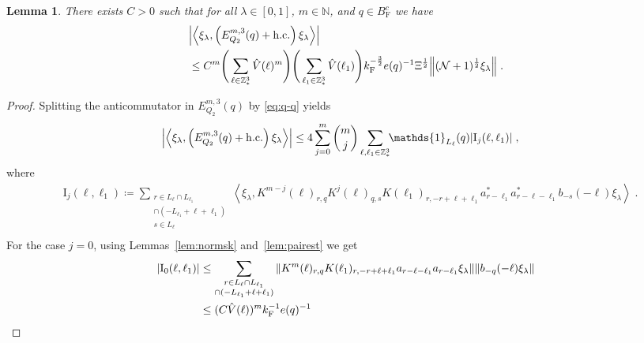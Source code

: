 \documentclass[12pt,a4paper]{article}
\numberwithin{equation}{section}
\newcommand{\NNN}{\mathbb{N}}
\newcommand{\1}{\mathbb{I}}
\newcommand{\F}{\mathrm{F}}
\newcommand{\I}{\mathrm{I}}
\newcommand{\Z}{\mathbb{Z}}
\newcommand{\NN}{\mathcal{N}}
\newcommand{\half}{\frac{1}{2}}
\newcommand{\eva}[1]{\left\langle #1 \right\rangle}
\theoremstyle{plain}
\newtheorem{lemma}[theorem]{Lemma}
\theoremstyle{definition}
\theoremstyle{remark}
\theoremstyle{plain}
\theoremstyle{definition}
\theoremstyle{remark}
\begin{document}
\begin{lemma} \label{lem:EQ215}
There exists $ C > 0 $ such that for all $ \lambda \in [0,1] $, $ m \in \NNN $, and $ q \in B_{\F}^c $ we have
\begin{align}\label{eq:estEQ215}
\begin{split}
	& \abs{\eva{\xi_\lambda,\left(E^{m,3}_{Q_2}(q) + \mathrm{h.c.}\right) \xi_\lambda }}
	\\
	& \leq C^m \Bigg(\sum_{\ell\in \Z^3_*} \hat{V}(\ell)^m \Bigg)
		\Bigg(\sum_{\ell_1\in \Z^3_*} \hat{V}(\ell_1) \Bigg)
		k_{\F}^{-\frac{3}{2}} e(q)^{-1} \Xi^{\half}
		\norm{(\NN+1)^\half \xi_\lambda } \;.
\end{split}
\end{align}
\end{lemma}

\begin{proof}
Splitting the anticommutator in $ E^{m,3}_{Q_2}(q) $ by \eqref{eq:q-q} yields
\begin{equation} \label{eq:EQ2151}
\begin{aligned}
	&\abs{\eva{\xi_\lambda,\left(E^{m,3}_{Q_2}(q) + \mathrm{h.c.}\right) \xi_\lambda }}
	\le 4 \sum_{j=0}^m {{m}\choose j} \sum_{\ell,\ell_1 \in \Z^3_*}\!\! \mathds{1}_{L_\ell}(q) |\I_j(\ell, \ell_1)| \;,
	\end{aligned}
\end{equation}
where
\begin{equation}
\begin{aligned}
	& \I_j(\ell, \ell_1)
	\coloneq \sum_{\substack{r\in L_{\ell} \cap L_{\ell_1}\\ \cap (-L_{\ell_1}+\ell+\ell_1)\\ s \in L_{\ell}}}
		\eva{\xi_\lambda, K^{m-j}(\ell)_{r,q} K^{j}(\ell)_{q,s} K(\ell_1)_{r,-r+\ell+\ell_1} a^*_{r-\ell_1} a^*_{r-\ell-\ell_1} b_{-s}(-\ell) \xi_\lambda} \;. \\
\end{aligned}
\end{equation}
For the case $j=0$, using Lemmas~\ref{lem:normsk} and~\ref{lem:pairest} we get
\begin{align}
	|\I_0(\ell, \ell_1)|
	&\leq \sum_{\substack{r\in L_{\ell} \cap L_{\ell_1} \\ \cap (-L_{\ell_1}+\ell+\ell_1)}} \norm{K^m(\ell)_{r,q} K(\ell_1)_{r,-r+\ell+\ell_1} a_{r-\ell-\ell_1} a_{r-\ell_1} \xi_\lambda}\norm{ b_{-q}(-\ell) \xi_\lambda}\nonumber\\
	&\leq (C \hat{V}(\ell))^m k_{\F}^{-1} e(q)^{-1}

\end{align}
\end{proof}
\end{document}
